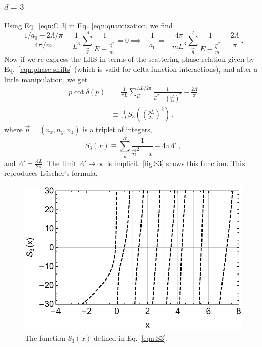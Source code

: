 \documentclass[11pt]{article}
\begin{document}
\subsubsection{$d=3$}
Using Eq.~\eqref{eqn:C 3} in Eq.~\eqref{eqn:quantization} we find
\begin{equation}
\frac{1/a_0-2\Lambda/\pi}{4\pi/m}-\frac{1}{L^3}\sum_{\vec{q}}^\Lambda \frac { 1 } { E - \frac{\vec{q}^2}{m} }=0
\implies-\frac{1}{a_0}=-\frac{4\pi}{mL^3}\sum_{\vec{q}}^\Lambda \frac { 1 } { E - \frac{\vec{q}^2}{m} }-\frac{2\Lambda}{\pi}\ .
\end{equation}
Now if we re-express the LHS in terms of the scattering phase relation given by Eq.~\eqref{eqn:phase shifts} (which is valid for delta function interactions), and after a little manipulation, we get
\begin{align}
p\cot \delta(p)&=\frac{1}{\pi L}\sum_{\vec{n}}^{\Lambda L/2\pi} \frac { 1 } { \vec{n}^2 -\left(\frac{pL}{2\pi}\right)^2}-\frac{2\Lambda}{\pi}\\
&\equiv \frac{1}{\pi L}S_3\left(\left(\frac{pL}{2\pi}\right)^2\right)\ ,
\end{align}
where $\vec{n}=(n_x,n_y,n_z)$ is a triplet of integers, 
\begin{equation}\label{eqn:S3}
S_3(x)\equiv\sum_{\vec{n}}^{\Lambda'} \frac { 1 } { \vec{n}^2 -x}-4\pi\Lambda'\ ,
\end{equation}
and $\Lambda'=\frac{\Lambda L}{2\pi}$.  The limit $\Lambda'\to\infty$ is implicit.  \autoref{fig:S3} shows this function. This reproduces L\"uscher's formula. 
\begin{figure}
\center
\includegraphics[width=.8\columnwidth]{figure/S3.pdf}
\caption{The function $S_3(x)$ defined in Eq.~\eqref{eqn:S3}.\label{fig:S3}}
\end{figure}
\end{document}
